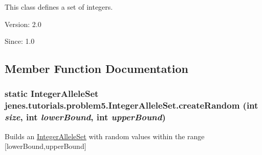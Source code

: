 This class defines a set of integers.

\begin{Desc}
\item[Version:]2.0 \end{Desc}
\begin{Desc}
\item[Since:]1.0 \end{Desc}


\subsection{Member Function Documentation}
\hypertarget{classjenes_1_1tutorials_1_1problem5_1_1_integer_allele_set_f241f0e8dd6564fb5b4c0047eb150bac}{
\subsubsection[createRandom]{\setlength{\rightskip}{0pt plus 5cm}static {\bf IntegerAlleleSet} jenes.tutorials.problem5.IntegerAlleleSet.createRandom (int {\em size}, \/  int {\em lowerBound}, \/  int {\em upperBound})}}
\label{classjenes_1_1tutorials_1_1problem5_1_1_integer_allele_set_f241f0e8dd6564fb5b4c0047eb150bac}


Builds an \hyperlink{classjenes_1_1tutorials_1_1problem5_1_1_integer_allele_set}{IntegerAlleleSet} with random values within the range \mbox{[}lowerBound,upperBound\mbox{]} 

